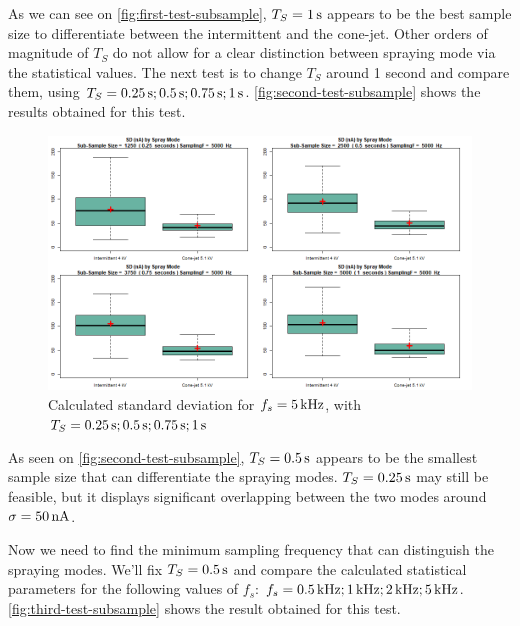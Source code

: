 \documentclass[oneside,12pt]{article}
\begin{document}
As we can see on \autoref{fig:first-test-subsample}, $T_S = 1 \,\mathrm{s}$ appears to be the best sample size to 
differentiate between the intermittent and the cone-jet. Other orders of magnitude of $T_S$ do not allow for a clear distinction
between spraying mode via the statistical values. The next test is to change $T_S$ around 1 second and compare them, 
using $T_S = 0.25 \,\mathrm{s}; 0.5 \,\mathrm{s}; 0.75 \,\mathrm{s}; 1 \,\mathrm{s}$. \autoref{fig:second-test-subsample} shows the results obtained  
for this test.

\begin{figure}[h!]
    \centering
    \includegraphics[width=\textwidth,trim=1 1 1 1,clip]{figures/second-test-subsample.png}
    \caption{Calculated standard deviation for $f_s = 5 \,\mathrm{kHz}$, with $T_S = 0.25 \,\mathrm{s}; 0.5 \,\mathrm{s}; 0.75 \,\mathrm{s}; 1 \,\mathrm{s}$}
    \label{fig:second-test-subsample}
\end{figure}

As seen on \autoref{fig:second-test-subsample}, $T_S = 0.5 \,\mathrm{s}$ appears to be the smallest sample size that can differentiate the spraying modes.
$T_S = 0.25 \,\mathrm{s}$ may still be feasible, but it displays significant overlapping between the two modes around $\sigma = 50 \,\mathrm{nA}$.

Now we need to find the minimum sampling frequency that can distinguish the spraying modes. We'll fix $T_S = 0.5 \,\mathrm{s}$ and compare the calculated 
statistical parameters for the following values of $f_s$: $f_s = 0.5 \,\mathrm{kHz}; 1 \,\mathrm{kHz}; 2 \,\mathrm{kHz}; 5 \,\mathrm{kHz}$. \autoref{fig:third-test-subsample}
shows the result obtained for this test.
\end{document}
